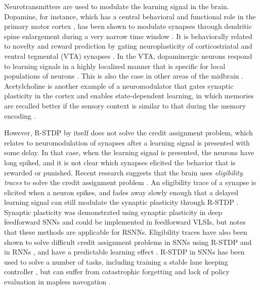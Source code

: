 Neurotransmitters are used to modulate the learning signal in the brain.
Dopamine, for instance, which has a central behavioral and functional role in the primary motor cortex \citep{barnes2005activity,dang2006disrupted}, has been shown to modulate synapses through dendritic spine enlargement during a very narrow time window \citep{dang2006disrupted}.
It is behaviorally related to novelty and reward prediction \citep{li2003dopamine,schultz2007behavioral} by gating neuroplasticity of corticostriatal \citep{reynolds2001cellular,reynolds2002dopamine} and ventral tegmental (VTA) synapses \citep{bao2001cortical}.
In the VTA, dopaminergic neurons respond to learning signals in a highly localized manner that is specific for local populations of neurons \citep{engelhard2019specialized}.
This is also the case in other areas of the midbrain \citep{roeper2013dissecting}.
Acetylcholine is another example of a neuromodulator that gates synaptic plasticity in the cortex and enables state-dependent learning, in which memories are recalled better if the sensory context is similar to that during the memory encoding \citep{shulz2000neuronal}.

However, R-STDP by itself does not solve the credit assignment problem, which relates to neuromodulation of synapses after a learning signal is presented with some delay.
In that case, when the learning signal is presented, the neurons have long spiked, and it is not clear which synapses elicited the behavior that is rewarded or punished.
Recent research suggests that the brain uses \emph{eligibility traces} \citep{izhikevich2007solving,florian2007reinforcement} to solve the credit assignment problem \citep{stolyarova2018solving,gerstner2018eligibility}.
An eligibility trace of a synapse is elicited when a neuron spikes, and fades away slowly enough that a delayed learning signal can still modulate the synaptic plasticity through R-STDP \citep{cassenaer2012conditional,yagishita2014critical,gerstner2018eligibility}.
Synaptic plasticity was demonstrated using synaptic plasticity in deep feedforward SNNs \citep{zenke2018superspike,neftci2017event,kaiser2020synaptic} and could be implemented in feedforward VLSIs, but \cite{zenke2018superspike} notes that these methods are applicable for RSNNs.
Eligibility traces have also been shown to solve difficult credit assignment problems in SNNs using R-STDP \citep{legenstein2008learning, bellec2020solution} and in RNNs \citep{he2015distinct}, and have a predictable learning effect \citep{legenstein2008learning}.
R-STDP in SNNs has been used to solve a number of tasks, including training a stable lane keeping controller \citep{bing2020indirect}, but can suffer from catastrophic forgetting and lack of policy evaluation in mapless navogation \citep{bing2018end}.

